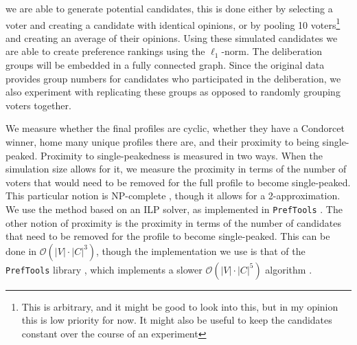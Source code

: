 we are able to generate potential
candidates, this is done either by selecting a voter and creating a candidate
with identical opinions, or by pooling 10 voters\footnote{This is arbitrary,
	and it might be good to look into this, but in my opinion this is low
	priority for now. It might also be useful to keep the candidates
	constant over the course of an experiment} and creating an average of
their opinions. Using these simulated candidates we are able to create
preference rankings using the $\ell_1$-norm.  The deliberation groups
will be embedded in a fully connected graph. Since the original data
provides group numbers for candidates who participated in the
deliberation, we also experiment with replicating these groups as
opposed to randomly grouping voters together.


We measure whether the final profiles are cyclic, whether they have a Condorcet
winner, home many unique profiles there are, and their proximity to being
single-peaked. Proximity to single-peakedness is measured in two ways. When the
simulation size allows for it, we measure the proximity in terms of the number
of voters that would need to be removed for the full profile to become
single-peaked. This particular notion is NP-complete
\cite{erdelyiComputationalAspectsNearly2013}, though it allows for a
2-approximation. We use the method based on an ILP solver, as implemented in
\texttt{PrefTools} \cite{PrefLibPreflibtools2025}. The other notion of proximity is the proximity in
terms of the number of candidates that need to be removed for the profile to
become single-peaked. This can be done in $\mathcal{O}(|V| \cdot{} |C|
	^3)$\cite{przedmojskiAlgorithmsExperimentsNearly}, though the implementation we
use is that of the \texttt{PrefTools} library \cite{PrefLibPreflibtools2025}, which implements
a slower $\mathcal{O}(|V| \cdot{} |C|^5)$ algorithm
\cite{erdelyiComputationalAspectsNearly2013}.






